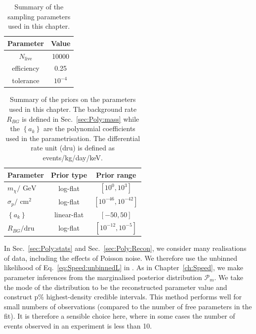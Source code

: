 \begin{table}[t]
  \setlength{\extrarowheight}{2pt}
  \setlength{\tabcolsep}{3pt}
  \begin{center}
	\begin{tabular}{c|c}
        \hline\hline
        Parameter & Value \\
        \hline
	$N_\textrm{live}$ & 10000 \\
	efficiency & 0.25 \\
	tolerance & $10^{-4}$ \\
        \hline\hline
	\end{tabular}
  \end{center}
\caption[Summary of the \multinest sampling parameters used in Chapter \ref{ch:Poly}]{Summary of the \multinest sampling parameters used in this chapter.}
\label{tab:Poly:MultiNest}
\end{table}

\begin{table}[t]
  \setlength{\extrarowheight}{2pt}
  \setlength{\tabcolsep}{3pt}
  \begin{center}
	\begin{tabular}{m{1in}|cc}
        \hline\hline
	Parameter & Prior type & Prior range\\
	\hline
	$m_\chi / \textrm{ GeV}$ &  log-flat & $\left[10^{0}, 10^{3}\right]$\\
	$\sigma_p / \textrm{ cm}^2$ & log-flat & $\left[10^{-46}, 10^{-42}\right]$ \\
	$\left\{a_k\right\}$ & linear-flat & $\left[-50, 50\right]$ \\
        $R_{BG} / \textrm{dru}$ & log-flat & $\left[10^{-12}, 10^{-5}\right]$ \\
        \hline\hline
	\end{tabular}
  \end{center}
\caption[Summary of the priors on the parameters used in Chapter \ref{ch:Poly}]{Summary of the priors on the parameters used in this chapter. The background rate $R_{BG}$ is defined in Sec.~\ref{sec:Poly:mass} while the $\left\{a_k\right\}$ are the polynomial coefficients used in the parametrisation. The differential rate unit (dru) is defined as events/kg/day/keV.}
\label{tab:Poly:priors}
\end{table}


In Sec.~\ref{sec:Poly:stats} and Sec.~\ref{sec:Poly:Recon}, we consider many realisations of data, including the effects of Poisson noise. We therefore use the unbinned likelihood of Eq.~\ref{eq:Speed:unbinnedL} in \multinest. As in Chapter~\ref{ch:Speed}, we make parameter inferences from the marginalised posterior distribution $\mathcal{P}_m$. We take the mode of the distribution to be the reconstructed parameter value and construct p\% highest-density credible intervals. This method performs well for small numbers of observations (compared to the number of free parameters in the fit). It is therefore a sensible choice here, where in some cases the number of events observed in an experiment is less than 10.

